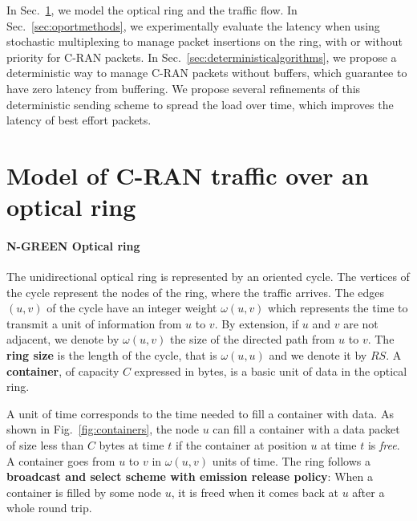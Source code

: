 \documentclass[10pt, conference, letterpaper]{IEEEtran}
\begin{document}
In Sec.~\ref{sec:model}, we model the optical ring and the traffic flow. In Sec.~\ref{sec:oportmethods}, we experimentally evaluate the latency when using stochastic multiplexing to manage packet insertions on the ring, with or without priority for C-RAN packets. In Sec.~\ref{sec:deterministicalgorithms}, we propose a deterministic way to manage C-RAN packets without buffers, which guarantee to have zero latency from buffering. We propose several refinements of this deterministic sending scheme to spread the load over time, which improves the latency of best effort packets.

\section{Model of C-RAN traffic over an optical ring}
\label{sec:model}
    
  \paragraph{N-GREEN Optical ring}
   
  The unidirectional optical ring is represented by an oriented cycle. The vertices of the cycle represent the nodes of the ring, where the traffic arrives. The edges $(u,v)$ of the cycle have an integer weight $\omega(u,v)$ which represents the time to transmit a unit of information from $u$ to $v$. By extension, if $u$ and $v$ are not adjacent, we denote by $\omega(u,v)$ the size of the directed path from $u$ to $v$.  The \textbf{ring size} is the length of the cycle, that is $\omega(u,u)$ and we denote it by $RS$. A {\bf container}, of capacity $C$  expressed in bytes, is a basic unit of data in the optical ring. 
  
  A unit of time corresponds to the time needed to fill a container with data.
  As shown in Fig.~\ref{fig:containers}, the node $u$ can fill a container with a data packet of size less than $C$ bytes at time $t$ if the container 
  at position $u$ at time $t$ is \emph{free}. A container goes from $u$ to $v$ in $\omega(u,v)$ units of time. The ring follows a {\bf broadcast and select scheme with emission release policy}: When a container is filled by some node $u$, it is freed when it comes back at $u$ after a whole round trip.
  
\end{document}
